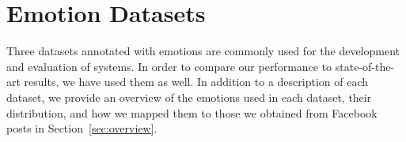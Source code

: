 \documentclass[11pt]{article}
\begin{document}
%                                     
%  
%







\section{Emotion Datasets}
\label{sec:emoData}

Three datasets annotated with emotions are commonly used for the development and evaluation of systems. In order to compare our performance to state-of-the-art results, we have used them as well. In addition to a description of each dataset, we provide an overview of the emotions used in each dataset, their distribution, and how we mapped them to those we obtained from Facebook posts in Section~\ref{sec:overview}.
\end{document}
